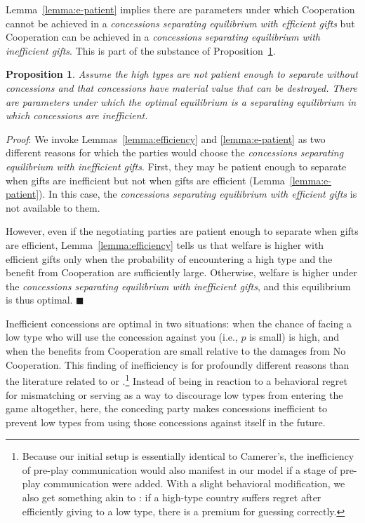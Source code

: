 \documentclass[bibtex,autowc]{apsr_submission}
\newtheorem{proposition}{Proposition}
\begin{document}
Lemma~\ref{lemma:e-patient} implies there are parameters under which Cooperation cannot be achieved in a \emph{concessions separating equilibrium with efficient gifts} but Cooperation can be achieved in a \emph{concessions separating equilibrium with inefficient gifts}. This is part of the substance of Proposition~\ref{proposition:4}. 

\begin{proposition}
		Assume the high types are not patient enough to separate without concessions and that concessions have material value that can be destroyed. There are parameters under which the optimal equilibrium is a separating equilibrium in which concessions are inefficient.
	\label{proposition:4}
\end{proposition}
\emph{Proof}: We invoke Lemmas~\ref{lemma:efficiency} and \ref{lemma:e-patient} as two different reasons for which the parties would choose the \emph{concessions separating equilibrium with inefficient gifts}. First, they may be patient enough to separate when gifts are inefficient but not when gifts are efficient (Lemma~\ref{lemma:e-patient}). In this case, the \emph{concessions separating equilibrium with efficient gifts} is not available to them.

However, even if the negotiating parties are patient enough to separate when gifts are efficient, Lemma~\ref{lemma:efficiency} tells us that welfare is higher with efficient gifts only when the probability of encountering a high type and the benefit from Cooperation are sufficiently large. Otherwise, welfare is higher under the \emph{concessions separating equilibrium with inefficient gifts}, and this equilibrium is thus optimal. \hfill $\blacksquare$\\
\vspace{-5pt}

Inefficient concessions are optimal in two situations: when the chance of facing a low type who will use the concession against you (i.e., $p$ is small) is high, and when the benefits from Cooperation are small relative to the damages from No Cooperation. This finding of inefficiency is for profoundly different reasons than the literature related to \cite{camerer1988} or \cite{prendergast2001}.\footnote{Because our initial setup is essentially identical to Camerer's, the inefficiency of pre-play communication would also manifest in our model if a stage of pre-play communication were added. With a slight behavioral modification, we also get something akin to \cite{prendergast2001}: if a high-type country suffers regret after efficiently giving to a low type, there is a premium for guessing correctly.} Instead of being in reaction to a behavioral regret for mismatching or serving as a way to discourage low types from entering the game altogether, here, the conceding party makes concessions inefficient to prevent low types from using those concessions against itself in the future.
\end{document}
